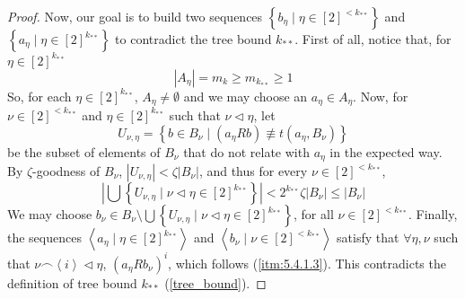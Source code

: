 \begin{proof}
            Now, our goal is to build two sequences $\left\{ b_\eta \mid \eta \in [2]^{<k_{**}} \right\}$ and
            $\left\{ a_\eta \mid \eta \in [2]^{k_{**}} \right\}$ to contradict the tree bound $k_{**}$.
            First of all, notice that, for $\eta \in [2]^{k_{**}}$
            $$
                |A_\eta| = m_k \geq m_{k_{**}} \geq 1
            $$
            So, for each $\eta \in [2]^{k_{**}}$, $A_\eta \neq \emptyset$ and we may choose an $a_\eta \in A_\eta$.
            Now, for $\nu \in [2]^{<k_{**}}$ and $\eta \in [2]^{k_{**}}$ such that $\nu \triangleleft \eta$, let
            $$
                U_{\nu,\eta} = \left\{ b \in B_\nu \mid (a_\eta R b) \not\equiv t(a_\eta, B_\nu) \right\}
            $$
            be the subset of elements of $B_\nu$ that do not relate with $a_\eta$ in the expected way.
            By $\zeta$-goodness of $B_\nu$, $|U_{\nu, \eta}| < \zeta |B_\nu|$, and thus for every $\nu \in [2]^{<k_{**}}$,
            \[
                \left|\bigcup\left\{ U_{\nu,\eta} \mid \nu \triangleleft \eta \in [2]^{k_{**}} \right\}\right| <
                2^{k_{**}} \zeta |B_\nu| \leq |B_\nu|
            \]
            We may choose $b_\nu \in B_\nu \setminus \bigcup\left\{ U_{\nu,\eta} \mid \nu \triangleleft \eta \in [2]^{k_{**}} \right\}$,
            for all $\nu \in [2]^{<k_{**}}$.
            Finally, the sequences $\left< a_\eta \mid \eta \in [2]^{k_{**}} \right>$ and
            $\left< b_\nu \mid \nu \in [2]^{<k_{**}} \right>$ satisfy that $\forall \eta, \nu$ such that
            $\nu \frown \left< i \right> \triangleleft \eta$, $\left( a_\eta R b_\nu \right)^i$, which follows
            (\ref{itm:5.4.1.3}).
            This contradicts the definition of tree bound $k_{**}$ (\ref{tree_bound}).
        \end{proof}

